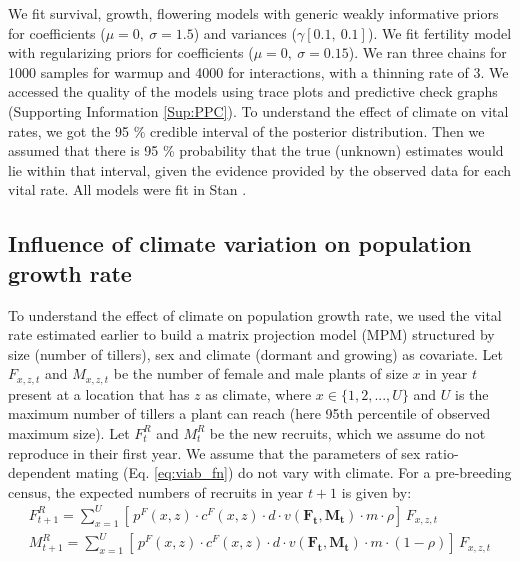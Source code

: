 \documentclass[12pt]{article}
\begin{document}
We fit survival, growth, flowering models with generic weakly informative priors for coefficients ($\mu = 0,\ \sigma = 1.5$) and variances ($\gamma [0.1,\ 0.1]$).
{\color{blue}We fit fertility model with regularizing priors for coefficients ($\mu = 0,\ \sigma = 0.15$).} 
We ran three chains for 1000 samples for warmup and 4000 for interactions, with a thinning rate of 3.
We accessed the quality of the models using trace plots and predictive check graphs \citep{piironen2017comparison} (Supporting Information \ref{Sup:PPC}).
To understand the effect of climate on vital rates, we got the 95 \% credible interval of the posterior distribution.  
Then we assumed that there is 95 \% probability that the true (unknown) estimates would lie within that interval, given the evidence provided by the observed data for each vital rate.
All models were fit in Stan \citep{rstan}. 

\subsection*{Influence of climate variation on population growth rate}
To understand the effect of climate on population growth rate, we used the vital rate estimated earlier to build a matrix projection model (MPM) structured by size (number of tillers), sex and climate (dormant and growing) as covariate.  
Let $F_{x,z,t}$ and $M_{x,z,t}$ be the number of female and male plants of size $x$ in year $t$ present at a location that has $z$ as climate, where $x \in \{1,2,...,U\}$ and $U$ is the maximum number of tillers a plant can reach (here 95th percentile of observed maximum size).
Let $F^{R}_{t}$ and $M^{R}_{t}$ be the new recruits, which we assume do not reproduce in their first year.
We assume that the parameters of sex ratio-dependent mating (Eq. \ref{eq:viab_fn}) do not vary with climate.  
For a pre-breeding census, the expected numbers of recruits in year $t+1$ is given by:
\begin{align}\label{eq:recruits}
F^{R}_{t+1} = \sum_{x=1}^{U} 	[ \, p^{F}(x,z) \cdot c^{F}(x,z) \cdot d \cdot v(\mathbf{F_{t}},\mathbf{M_{t}}) \cdot m \cdot \rho 	] \, F_{x,z,t}
\\
M^{R}_{t+1} = \sum_{x=1}^{U} 	[ \, p^{F}(x,z) \cdot c^{F}(x,z) \cdot d \cdot v(\mathbf{F_{t}},\mathbf{M_{t}}) \cdot m \cdot (1-\rho) 	] \, F_{x,z,t}
\end{align}
\end{document}

